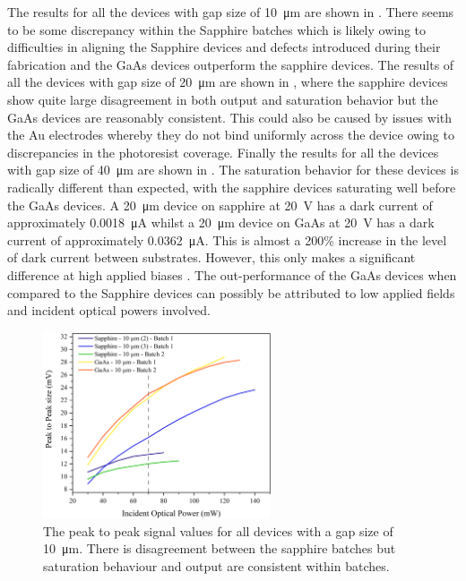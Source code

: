 The results for all the devices with gap size of \SI{10}{\micro\metre} are shown in . There seems to be some discrepancy within the Sapphire batches which is likely owing to difficulties in aligning the Sapphire devices and defects introduced during their fabrication and the GaAs devices outperform the sapphire devices. The results of all the devices with gap size of \SI{20}{\micro\metre} are shown in , where the sapphire devices show quite large disagreement in both output and saturation behavior but the GaAs devices are reasonably consistent. This could also be caused by issues with the Au electrodes whereby they do not bind uniformly across the device owing to discrepancies in the photoresist coverage. Finally the results for all the devices with gap size of \SI{40}{\micro\metre} are shown in . The saturation behavior for these devices is radically different than expected, with the sapphire devices saturating well before the GaAs devices. A \SI{20}{\micro\metre} device on sapphire at \SI{20}{V} has a dark current of approximately \SI{0.0018}{\micro\ampere} whilst a \SI{20}{\micro\metre} device on GaAs at \SI{20}{V} has a dark current of approximately \SI{0.0362}{\micro\ampere}. This is almost a 200\% increase in the level of dark current between substrates. However, this only makes a significant difference at high applied biases \cite{Bacon2016}. The out\nobreakdash-performance of the GaAs devices when compared to the Sapphire devices can possibly be attributed to low applied fields and incident optical powers involved.

\begin{figure}[h!]
    \centering
    \includegraphics[width=0.6\textwidth]{Figures/Misc/SysDev/Opt10micronG.png}
    \captionsetup{font = footnotesize, justification = centering}
    \caption[The Peak to Peak Signal Values for all Devices with \SI{10}{\micro\metre} Gap]{The peak to peak signal values for all devices with a gap size of \SI{10}{\micro\metre}. There is disagreement between the sapphire batches but saturation behaviour and output are consistent within batches.}
    \label{fig:10micron}
\end{figure}


